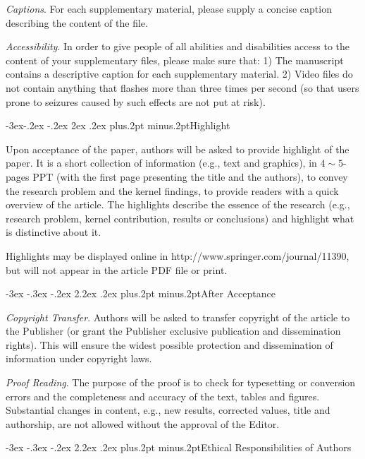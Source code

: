 \documentclass[twoside]{article}
\makeatletter
\def\section{\@startsection{section}{1}{\z@}%
 {-3ex \@plus -.3ex \@minus -.2ex}%
 {2.2ex \@plus.2ex}%
{\normalfont\normalsize\protect\baselineskip=14.5pt plus.2pt minus.2pt\bfseries}}
\def\subsection{\@startsection{subsection}{2}{\z@}%
 {-3ex\@plus -.2ex \@minus -.2ex}%
 {2ex \@plus.2ex}%
{\normalfont\normalsize\protect\baselineskip=12.5pt plus.2pt minus.2pt\bfseries}}
\makeatother
\begin{document}
\begin{multicols}{2}
{\it Captions}. For each supplementary material, please supply a concise caption describing the content of the file.

{\it Accessibility}. In order to give people of all abilities and disabilities access to the content of your supplementary files, please make sure that: 1) The manuscript contains a descriptive caption for each supplementary material. 2) Video files do not contain anything that flashes more than three times per second (so that users prone to seizures caused by such effects are not put at risk).

\subsection{Highlight}

Upon acceptance of the paper, authors will be asked to provide highlight of the paper. It is a short collection of information (e.g., text and graphics), in $4\sim 5$-pages PPT (with the first page presenting the title and the authors), to convey the research problem and the kernel findings, to provide readers with a quick overview of the article. The highlights describe the essence of the research (e.g., research problem, kernel contribution, results or conclusions) and highlight what is distinctive about it.

Highlights may be displayed online in http://www.springer.com/journal/11390, but will not appear in the article PDF file or print.

\section{After Acceptance}

{\it Copyright Transfer}. Authors will be asked to transfer copyright of the article to the Publisher (or grant the Publisher exclusive publication and dissemination rights). This will ensure the widest possible protection and dissemination of information under copyright laws.

{\it Proof Reading}. The purpose of the proof is to check for typesetting or conversion errors and the completeness and accuracy of the text, tables and figures. Substantial changes in content, e.g., new results, corrected values, title and authorship, are not allowed without the approval of the Editor.

\section{Ethical Responsibilities of Authors}


\end{multicols}
\end{document}

